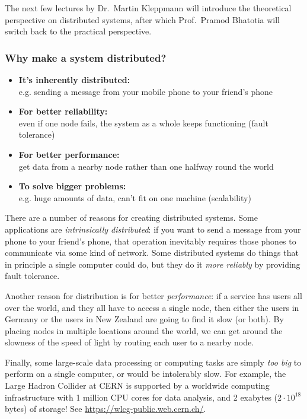 The next few lectures by Dr.\ Martin Kleppmann will introduce the theoretical perspective on distributed systems, after which Prof.\ Pramod Bhatotia will switch back to the practical perspective.

\begin{frame}
    \label{s:why-distribute}
    \frametitle{Why make a system distributed?}
    \begin{itemize}\pause
        \item \textbf{It's inherently distributed:}\\e.g. sending a message from your mobile phone to your friend's phone\pause
        \item \textbf{For better reliability:}\\even if one node fails, the system as a whole keeps functioning (fault tolerance)\pause
        \item \textbf{For better performance:}\\get data from a nearby node rather than one halfway round the world\pause
        \item \textbf{To solve bigger problems:}\\e.g. huge amounts of data, can't fit on one machine (scalability)
    \end{itemize}
\end{frame}
\label{l:why-distribute}

There are a number of reasons for creating distributed systems.
Some applications are \emph{intrinsically distributed}: if you want to send a message from your phone to your friend's phone, that operation inevitably requires those phones to communicate via some kind of network.
Some distributed systems do things that in principle a single computer could do, but they do it \emph{more reliably} by providing fault tolerance.

Another reason for distribution is for better \emph{performance}: if a service has users all over the world, and they all have to access a single node, then either the users in Germany or the users in New Zealand are going to find it slow (or both).
By placing nodes in multiple locations around the world, we can get around the slowness of the speed of light by routing each user to a nearby node.

Finally, some large-scale data processing or computing tasks are simply \emph{too big} to perform on a single computer, or would be intolerably slow.
For example, the Large Hadron Collider at CERN is supported by a worldwide computing infrastructure with 1 million CPU cores for data analysis, and 2 exabytes ($2 \cdot 10^{18}$ bytes) of storage! See \url{https://wlcg-public.web.cern.ch/}.

